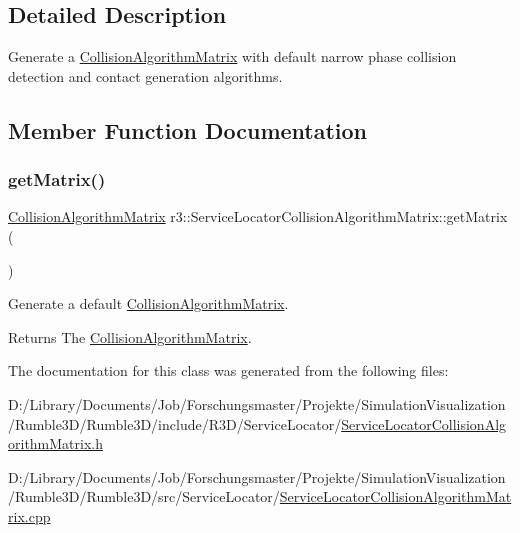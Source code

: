 \subsection{Detailed Description}
Generate a \mbox{\hyperlink{classr3_1_1_collision_algorithm_matrix}{Collision\+Algorithm\+Matrix}} with default narrow phase collision detection and contact generation algorithms. 

\subsection{Member Function Documentation}
\mbox{\label{classr3_1_1_service_locator_collision_algorithm_matrix_a3616f828528161b552f5c3bc5dc6aa65}} 
\subsubsection{\texorpdfstring{get\+Matrix()}{getMatrix()}}
{\footnotesize\ttfamily \mbox{\hyperlink{classr3_1_1_collision_algorithm_matrix}{Collision\+Algorithm\+Matrix}} r3\+::\+Service\+Locator\+Collision\+Algorithm\+Matrix\+::get\+Matrix (\begin{DoxyParamCaption}{ }\end{DoxyParamCaption})\hspace{0.3cm}{\ttfamily [static]}}



Generate a default \mbox{\hyperlink{classr3_1_1_collision_algorithm_matrix}{Collision\+Algorithm\+Matrix}}. 

\begin{DoxyReturn}{Returns}
The \mbox{\hyperlink{classr3_1_1_collision_algorithm_matrix}{Collision\+Algorithm\+Matrix}}. 
\end{DoxyReturn}


The documentation for this class was generated from the following files\+:\begin{DoxyCompactItemize}
\item 
D\+:/\+Library/\+Documents/\+Job/\+Forschungsmaster/\+Projekte/\+Simulation\+Visualization/\+Rumble3\+D/\+Rumble3\+D/include/\+R3\+D/\+Service\+Locator/\mbox{\hyperlink{_service_locator_collision_algorithm_matrix_8h}{Service\+Locator\+Collision\+Algorithm\+Matrix.\+h}}\item 
D\+:/\+Library/\+Documents/\+Job/\+Forschungsmaster/\+Projekte/\+Simulation\+Visualization/\+Rumble3\+D/\+Rumble3\+D/src/\+Service\+Locator/\mbox{\hyperlink{_service_locator_collision_algorithm_matrix_8cpp}{Service\+Locator\+Collision\+Algorithm\+Matrix.\+cpp}}\end{DoxyCompactItemize}
